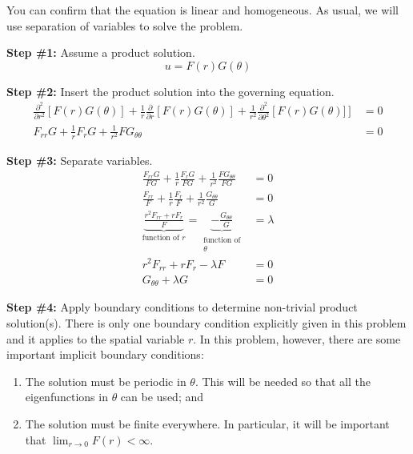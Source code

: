 \vspace{0.1cm}

\noindent You can confirm that the equation is linear and homogeneous.  As usual, we will use separation of variables to solve the problem.

\vspace{0.25cm}

\noindent\textbf{Step \#1:} Assume a product solution.
\begin{equation*}
u = F(r)G(\theta) 
\end{equation*}

\vspace{0.25cm}

\noindent\textbf{Step \#2:} Insert the product solution into the governing equation.  
\begin{align*}
\frac{\partial^2}{\partial r^2}\left[F(r)G(\theta)\right] + \frac{1}{r}\frac{\partial}{\partial r}\left[F(r)G(\theta)\right] + \frac{1}{r^2}\frac{\partial^2}{\partial \theta^2}\left[F(r)G(\theta)]\right] &=0 \\
F_{rr}G + \frac{1}{r}F_rG + \frac{1}{r^2}FG_{\theta \theta} &= 0
\end{align*}

\vspace{0.25cm}

\noindent\textbf{Step \#3:} Separate variables.
\begin{align*}
\frac{F_{rr}G}{FG} + \frac{1}{r}\frac{F_rG}{FG} + \frac{1}{r^2}\frac{FG_{\theta \theta}}{FG} &= 0 \\
\frac{F_{rr}}{F} + \frac{1}{r}\frac{F_r}{F} + \frac{1}{r^2}\frac{G_{\theta \theta}}{G} &= 0 \\
\underbrace{\frac{r^2 F_{rr} + r F_r}{F}}_{\text{function of } r} = \underbrace{-\frac{G_{\theta \theta}}{G}}_{\substack{\text{function of} \\ \theta}} &= \lambda \\
r^2 F_{rr} + r F_{r} - \lambda F &= 0 \\
G_{\theta \theta} + \lambda G &= 0
\end{align*}

\vspace{4.0cm}

\noindent\textbf{Step \#4:} Apply boundary conditions to determine non-trivial product solution(s).  There is only one boundary condition explicitly given in this problem and it applies to the spatial variable $r$.  In this problem, however, there are some important implicit boundary conditions:
\begin{enumerate}
\item The solution must be periodic in $\theta$. This will be needed so that all the eigenfunctions in $\theta$ can be used; and
\item The solution must be finite everywhere.  In particular, it will be important that $\lim_{r\to 0} F(r) < \infty$.  
\end{enumerate}

